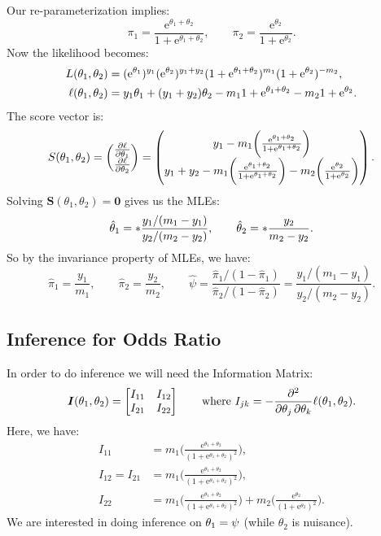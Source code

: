 \documentclass{article}\usepackage[]{graphicx}\usepackage[svgnames]{xcolor}
\let\log\relax%
\providecommand{\Vector}[1]{\bm{#1}}%
\providecommand{\Matrix}[1]{\bm{#1}}
\begin{document}
Our re-parameterization implies:
\[ \pi_1=\frac{\mathrm{e}^{\theta_1+\theta_2}}{1+\mathrm{e}^{\theta_1+\theta_2}},\qquad \pi_2=\frac{\mathrm{e}^{\theta_2}}{1+\mathrm{e}^{\theta_2}}. \]
Now the likelihood becomes:
\begin{align*}
    L(\theta_1,\theta_2)    & =(\mathrm{e}^{\theta_1})^{y_1}(\mathrm{e}^{\theta_2})^{y_1+y_2}(1+\mathrm{e}^{\theta_1+\theta_2})^{m_1}(1+\mathrm{e}^{\theta_2})^{-m_2}, \\
    \ell(\theta_1,\theta_2) & =y_1\theta_1+(y_1+y_2)\theta_2-m_1\log{1+\mathrm{e}^{\theta_1+\theta_2}}-m_2\log{1+\mathrm{e}^{\theta_2}}.
\end{align*}
The score vector is:
\[ S(\theta_1,\theta_2)=\begin{pmatrix}
        \pdv{\ell}{\theta_1} \\
        \pdv{\ell}{\theta_2}
    \end{pmatrix}=\begin{pmatrix}
        y_1-m_1\biggl(\frac{\mathrm{e}^{\theta_1+\theta_2}}{1+\mathrm{e}^{\theta_1+\theta_2}} \biggr) \\
        y_1+y_2-m_1\biggl(\frac{\mathrm{e}^{\theta_1+\theta_2}}{1+\mathrm{e}^{\theta_1+\theta_2}} \biggr)-m_2\biggl(\frac{\mathrm{e}^{\theta_2}}{1+\mathrm{e}^{\theta_2}} \biggr)
    \end{pmatrix}. \]
Solving $ \Vector{S}(\theta_1,\theta_2)=\Vector{0} $ gives us the MLEs:
\[ \hat{\theta}_1=\log*{\frac{y_1/(m_1-y_1)}{y_2/(m_2-y_2)}},\qquad \hat{\theta}_2=\log*{\frac{y_2}{m_2-y_2}}. \]
So by the invariance property of MLEs, we have:
\[ \hat{\pi}_1=\frac{y_1}{m_1},\qquad \hat{\pi}_2=\frac{y_2}{m_2},\qquad\hat{\psi}=\frac{\hat{\pi}_1/(1-\hat{\pi}_1)}{\hat{\pi}_2/(1-\hat{\pi}_2)}=\frac{y_1/(m_1-y_1)}{y_2/(m_2-y_2)}.  \]
\subsection*{Inference for Odds Ratio}
In order to do inference we will need the Information Matrix:
\[ \Matrix{I}(\theta_1,\theta_2)=\begin{bmatrix}
        I_{11} & I_{12} \\
        I_{21} & I_{22}
    \end{bmatrix}\qquad\text{where }I_{jk}=-\pdv*{\ell(\theta_1,\theta_2)}{\theta_j,\theta_k}. \]
Here, we have:
\begin{align*}
    I_{11}          & =m_1\biggl(\frac{\mathrm{e}^{\theta_1+\theta_2}}{(1+\mathrm{e}^{\theta_1+\theta_2})^2} \biggr),                                                                             \\
    I_{12}  =I_{21} & =m_1\biggl(\frac{\mathrm{e}^{\theta_1+\theta_2}}{(1+\mathrm{e}^{\theta_1+\theta_2})^2} \biggr),                                                                             \\
    I_{22}          & =m_1\biggl(\frac{\mathrm{e}^{\theta_1+\theta_2}}{(1+\mathrm{e}^{\theta_1+\theta_2})^2} \biggr)+m_2\biggl(\frac{\mathrm{e}^{\theta_2}}{(1+\mathrm{e}^{\theta_2})^2} \biggr).
\end{align*}
We are interested in doing inference on $ \theta_1=\log{\psi} $ (while $ \theta_2 $ is nuisance).
\end{document}
